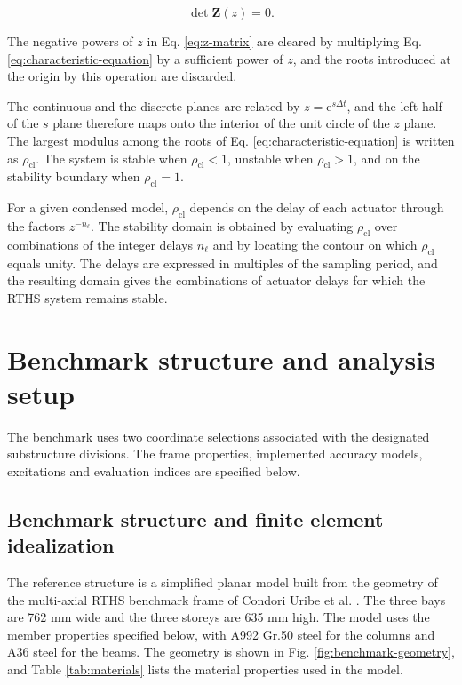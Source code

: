 \documentclass[a4paper,fleqn,review,12pt]{cas-sc}
\numberwithin{equation}{section}
\newcommand{\rev}[1]{{\color{red}#1}}
\begin{document}
\begin{equation}
	\det\mathbf{Z}(z)=0.
	\label{eq:characteristic-equation}
\end{equation}

The negative powers of \(z\) in Eq. \eqref{eq:z-matrix} are cleared by multiplying Eq. \eqref{eq:characteristic-equation} by a sufficient power of \(z\), and the roots introduced at the origin by this operation are discarded.

The continuous and the discrete planes are related by \(z=\mathrm{e}^{s\Delta t}\), and the left half of the \(s\) plane therefore maps onto the interior of the unit circle of the \(z\) plane. The largest modulus among the roots of Eq. \eqref{eq:characteristic-equation} is written as \(\rho_{\mathrm{cl}}\). The system is stable when \(\rho_{\mathrm{cl}}<1\), unstable when \(\rho_{\mathrm{cl}}>1\), and on the stability boundary when \(\rho_{\mathrm{cl}}=1\).

For a given condensed model, \(\rho_{\mathrm{cl}}\) depends on the delay of each actuator through the factors \(z^{-n_{\ell}}\). The stability domain is obtained by evaluating \(\rho_{\mathrm{cl}}\) over combinations of the integer delays \(n_{\ell}\) and by locating the contour on which \(\rho_{\mathrm{cl}}\) equals unity. The delays are expressed in multiples of the sampling period, and the resulting domain gives the combinations of actuator delays for which the RTHS system remains stable.




\section{Benchmark structure and analysis setup} \label{sec4}

\rev{The benchmark uses two coordinate selections associated with the designated substructure divisions. The frame properties, implemented accuracy models, excitations and evaluation indices are specified below.}

\subsection{Benchmark structure and finite element idealization}
\label{sec:benchmark}

The reference structure is a simplified planar model built from the \rev{geometry} of the multi-axial RTHS benchmark frame of Condori Uribe et al. \cite{Condori2023}. The three bays are 762 mm wide and the three storeys are 635 mm high. \rev{The model uses the member properties specified below, with A992 Gr.50 steel for the columns and A36 steel for the beams.} \rev{The geometry is shown in Fig. \ref{fig:benchmark-geometry}, and Table \ref{tab:materials} lists the material properties used in the model.}
\end{document}
